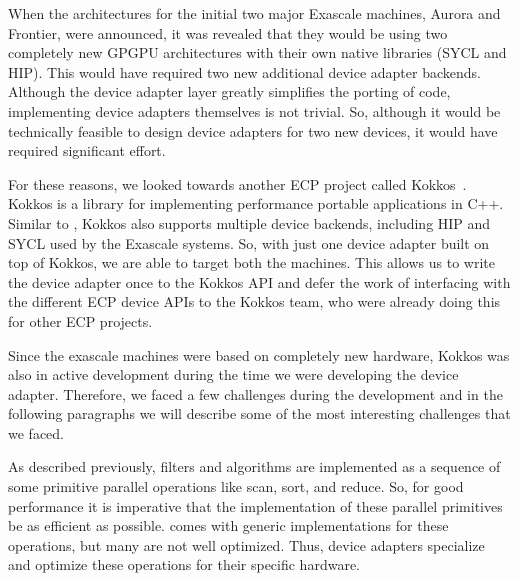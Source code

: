 When the architectures for the initial two major Exascale machines, Aurora and Frontier, were announced, it was revealed that they would be using two completely new GPGPU architectures with their own native libraries (SYCL and HIP).
This would have required two new additional device adapter backends.
Although the device adapter layer greatly simplifies the porting of \vtkm code, implementing device adapters themselves is not trivial.
So, although it would be technically feasible to design device adapters for two new devices, it would have required significant effort.

For these reasons, we looked towards another ECP project called Kokkos~\cite{Edwards2014, Trott2022}. Kokkos is a library for implementing performance portable applications in C++. Similar to \vtkm, Kokkos also supports multiple device backends, including HIP and SYCL used by the Exascale systems. So, with just one device adapter built on top of Kokkos, we are able to target both the machines.
This allows us to write the \vtkm device adapter once to the Kokkos API and defer the work of interfacing with the different ECP device APIs to the Kokkos team, who were already doing this for other ECP projects.

Since the exascale machines were based on completely new hardware, Kokkos was also in active development during the time we were developing the device adapter. Therefore, we faced a few challenges during the development and in the following paragraphs we will describe some of the most interesting challenges that we faced.

As described previously, \vtkm filters and algorithms are implemented as a sequence of some primitive parallel operations like scan, sort, and reduce.
So, for good performance it is imperative that the implementation of these parallel primitives be as efficient as possible.
\vtkm comes with generic implementations for these operations, but many are not well optimized.
Thus, device adapters specialize and optimize these operations for their specific hardware.

